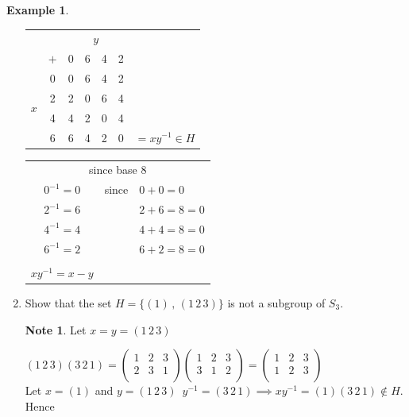 \documentclass[11pt,a4paper]{article}
\theoremstyle{definition}
\newtheorem{exa}[thm]{Example}
\newtheorem*{note}{Note}
\begin{document}
\begin{exa}
\begin{enumerate}
\begin{table}[H]
\centering
\begin{tabular}{cc|c|c|c|c|c}
 &  & \multicolumn{4}{c}{$y$} & \\
 & $+$ & 0 & 6 & 4 & 2 & \\
\cline{2-6}
\multirow{4}{*}{$x$} & 0 & 0 & 6 & 4 & 2 & \\
& 2 & 2 & 0 & 6 & 4 & \\
& 4 & 4 & 2 & 0 & 4 & \\
& 6 & 6 & 4 & 2 & 0 & $=xy^{-1} \in H$\\
\cline{3-6}
\end{tabular}
\hspace{1.5cm}
\begin{tabular}{ccl}
\multicolumn{3}{c}{since base 8}\\
$0^{-1} = 0$  & since & $0 + 0 = 0$\\
$2^{-1} = 6$  &       & $2 + 6 = 8 = 0$\\
$4^{-1} = 4$  &       & $4 + 4 = 8 = 0$\\
$6^{-1} = 2$  &       & $ 6 + 2 = 8 = 0$\\\\
$xy^{-1} = x-y$ & & \\
\end{tabular}
\end{table}






\item Show that the set $H = \{(1)\, , \, (1\, 2\, 3)\}$ is not a subgroup of $S_3$.\\

\begin{note}
Let $x  = y  = (1\, 2\, 3)$\\
\end{note}

$(1\, 2\, 3)(3\, 2\, 1)  = \begin{pmatrix}
1 & 2 & 3\\
2 & 3 & 1\\
\end{pmatrix}\begin{pmatrix}
1 & 2 & 3\\
3 & 1 & 2\\
\end{pmatrix}=\begin{pmatrix}
1 & 2 & 3\\
1 & 2 & 3\\
\end{pmatrix}$\\

Let $x = (1)$ and $y = (1\, 2\, 3)\,\,\, y^{-1} = (3\, 2\, 1)\implies xy^{-1} = (1)(3\, 2\, 1)\not\in H$. Hence \\\\
\end{enumerate}
\end{exa}
\end{document}
